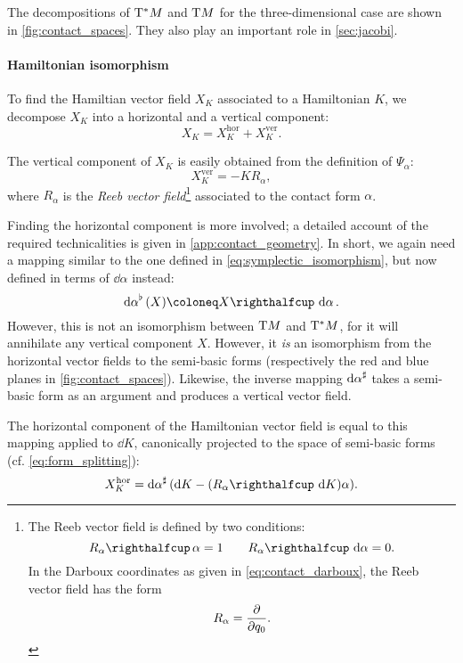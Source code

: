 The decompositions of $\mathrm{T}^*M$ and $\mathrm{T}M$ for the three-dimensional case are shown in \cref{fig:contact_spaces}. They also play an important role in \cref{sec:jacobi}.

\paragraph{Hamiltonian isomorphism}
To find the Hamiltian vector field $X_K$ associated to a Hamiltonian $K$, we decompose $X_K$ into a horizontal and a vertical component:
$$ X_K = X_K^\text{hor} + X_K^\text{ver}. $$

The vertical component of $X_K$ is easily obtained from the definition of $\Psi_\alpha$:
\begin{equation}
    X_K^\text{ver} = -K R_\alpha,
    \label{eq:vertical_vf}
\end{equation}
where $R_\alpha$ is the \emph{Reeb vector field}\footnote{
    The Reeb vector field is defined by two conditions: \cite{Libermann1987}
        $$ \intpr{R_\alpha}{\alpha} = 1 \qquad \intpr{R_\alpha}{\dd{\alpha}} = 0.$$
    In the Darboux coordinates as given in \cref{eq:contact_darboux}, the Reeb vector field has the form
        $$ R_\alpha = \pdv{}{q_0}. $$} 
associated to the contact form $\alpha$.

Finding the horizontal component is more involved; a detailed account of the required technicalities is given in \cref{app:contact_geometry}. In short, we again need a mapping similar to the one defined in \cref{eq:symplectic_isomorphism}, but now defined in terms of $\dd{\alpha}$ instead:
\begin{equation}
    \toDual{\dd{\alpha}}(X) \coloneq \intpr{X}{\dd{\alpha}}.
    \label{eq:contact_isomorphism}
\end{equation}
However, this is not an isomorphism between $\mathrm{T}M$ and $\mathrm{T}^*M$, for it will annihilate any vertical component $X$. However, it \emph{is} an isomorphism from the horizontal vector fields to the semi-basic forms (respectively the red and blue planes in \cref{fig:contact_spaces}). Likewise, the inverse mapping $\dd{\alpha}^\sharp$ takes a semi-basic form as an argument and produces a vertical vector field. 

The horizontal component of the Hamiltonian vector field is equal to this mapping applied to $\dd{K}$, canonically projected to the space of semi-basic forms (cf. \cref{eq:form_splitting}):
\begin{equation}
    X_K^\text{hor} = \fromDual{\dd{\alpha}}\qty(\dd{K} - (\intpr{R_\alpha}{\dd{K}})\alpha).
    \label{eq:horizontal_vf}
\end{equation}

